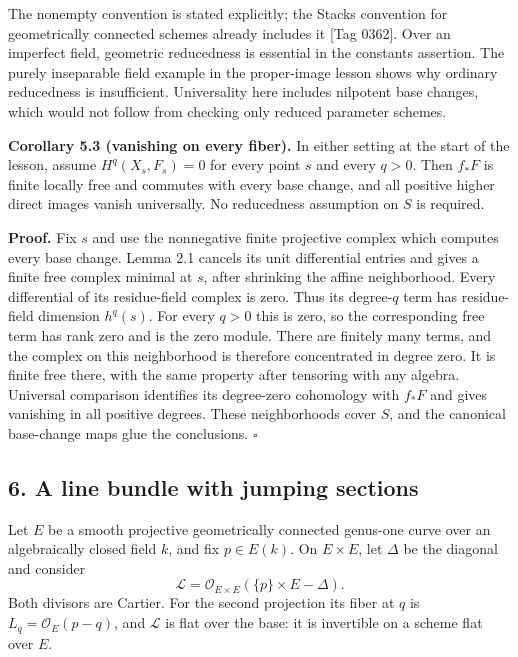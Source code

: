 \documentclass[11pt]{article}
\begin{document}
The nonempty convention is stated explicitly; the Stacks convention for
geometrically connected schemes already includes it {[}Tag 0362{]}. Over
an imperfect field, geometric reducedness is essential in the constants
assertion. The purely inseparable field example in the proper-image
lesson shows why ordinary reducedness is insufficient. Universality here
includes nilpotent base changes, which would not follow from checking
only reduced parameter schemes.

\textbf{Corollary 5.3 (vanishing on every fiber).} In either setting at
the start of the lesson, assume \(H^q(X_s,F_s)=0\) for every point \(s\)
and every \(q>0\). Then \(f_*F\) is finite locally free and commutes
with every base change, and all positive higher direct images vanish
universally. No reducedness assumption on \(S\) is required.

\textbf{Proof.} Fix \(s\) and use the nonnegative finite projective
complex which computes every base change. Lemma 2.1 cancels its unit
differential entries and gives a finite free complex minimal at \(s\),
after shrinking the affine neighborhood. Every differential of its
residue-field complex is zero. Thus its degree-\(q\) term has
residue-field dimension \(h^q(s)\). For every \(q>0\) this is zero, so
the corresponding free term has rank zero and is the zero module. There
are finitely many terms, and the complex on this neighborhood is
therefore concentrated in degree zero. It is finite free there, with the
same property after tensoring with any algebra. Universal comparison
identifies its degree-zero cohomology with \(f_*F\) and gives vanishing
in all positive degrees. These neighborhoods cover \(S\), and the
canonical base-change maps glue the conclusions. \(\square\)

\subsection{6. A line bundle with jumping
sections}\label{a-line-bundle-with-jumping-sections}

Let \(E\) be a smooth projective geometrically connected genus-one curve
over an algebraically closed field \(k\), and fix \(p\in E(k)\). On
\(E\times E\), let \(\Delta\) be the diagonal and consider \[
\mathcal L=\mathcal O_{E\times E}(\{p\}\times E-\Delta).
\] Both divisors are Cartier. For the second projection its fiber at
\(q\) is \(L_q=\mathcal O_E(p-q)\), and \(\mathcal L\) is flat over the
base: it is invertible on a scheme flat over \(E\).
\end{document}

